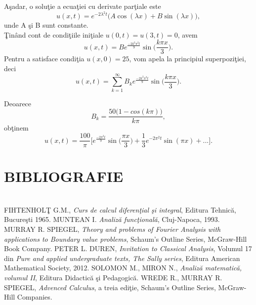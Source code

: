 \documentclass{beamer}
\begin{document}
\begin{frame}
\hspace*{20pt}A\c sadar, o solu\c tie a ecua\c tiei cu derivate par\c tiale este 
\begin{equation*}
u(x,t)=e^{-2\lambda^2t}\big(A\cos(\lambda x)+B\sin(\lambda x)\big),
\end{equation*}
unde A \c si B sunt constante.\\
\hspace*{20pt}\c Tin\^ and cont de condi\c tiile ini\c tiale $u(0,t)=u(3,t)=0$, avem 
\begin{equation*}
u(x,t)=B e^{\frac{-2k^2\pi^2t}{9}}\sin\Big(\frac{k\pi x}{3}\Big).
\end{equation*} 
\hspace*{20pt}Pentru a satisface condi\c tia $u(x,0)=25$, vom apela la principiul superpozi\c tiei, deci
\begin{equation*}
u(x,t)=\sum_{k=1}^\infty B_k e^{\frac{-2k^2\pi^2t}{9}}\sin\Big(\frac{k\pi x}{3}\Big).
\end{equation*}
\end{frame}


\begin{frame}
\hspace*{20pt}Deoarece 
\begin{equation*}
B_k= \frac{50\big(1-cos(k\pi)\big)}{k\pi},
\end{equation*}
ob\c tinem
\begin{equation*}
u(x,t)=\frac{100}{\pi}\Big[e^{\frac{-2\pi^2t}{9}}\sin\Big(\frac{\pi x}{3}\Big)+ \frac{1}{3}e^{-2\pi^2t}\sin(\pi x)+...\Big].
\end{equation*}
\end{frame}




\section*{BIBLIOGRAFIE}

\begin{frame}
\begin{thebibliography}\\
\bibitem{}FIHTENHOL\c T G.M., \textit{Curs de calcul diferen\c tial \c si integral}, Editura Tehnic\u a, Bucure\c sti 1965.
\bibitem{}MUNTEAN I. \textit{Analiz\u a func\c tional\u a}, Cluj-Napoca, 1993.
\bibitem{}MURRAY R. SPIEGEL, \textit{Theory and problems of Fourier Analysis with applications to Boundary value problems}, Schaum's Outline Series, McGraw-Hill Book Company.
\bibitem{}PETER L. DUREN, \textit{Invitation to Classical Analysis}, Volumul 17 din \textit{Pure and applied undergraduate texts, The Sally series}, Editura American Mathematical Society, 2012.
\bibitem{}SOLOMON M., MIRON N., \textit{Analiz\u a matematic\u a, volumul II}, Editura Didactic\u a \c si Pedagogic\u a.
\bibitem{}WREDE R., MURRAY R. SPIEGEL, \textit{Advenced Calculus}, a treia edi\c tie, Schaum's Outline Series, McGraw-Hill Companies.
\end{thebibliography}
\end{frame}
\end{document}
